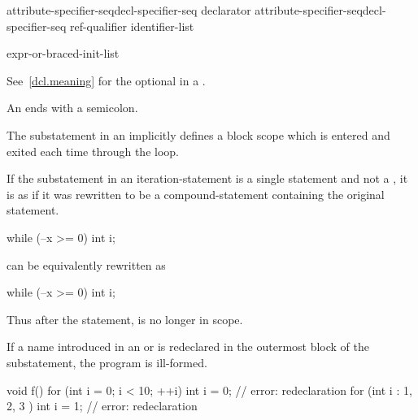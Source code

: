 \begin{bnf}
\br
    attribute-specifier-seq\opt decl-specifier-seq declarator\br
    attribute-specifier-seq\opt decl-specifier-seq ref-qualifier\opt{} \terminal{[} identifier-list \terminal{]}
\end{bnf}

\begin{bnf}
\br
    expr-or-braced-init-list
\end{bnf}

See~\ref{dcl.meaning} for the optional  in a
.
\begin{note}
An  ends with a semicolon.
\end{note}

\pnum
The substatement in an  implicitly defines
a block scope which is entered and exited each time
through the loop.

%
If the substatement in an iteration-statement is a single statement and
not a , it is as if it was rewritten to be
a compound-statement containing the original statement.
\begin{example}

\begin{codeblock}
while (--x >= 0)
  int i;
\end{codeblock}

can be equivalently rewritten as

\begin{codeblock}
while (--x >= 0) {
  int i;
}
\end{codeblock}

Thus after the  statement,  is no longer in scope.
\end{example}

\pnum
If a name introduced in an
 or 
is redeclared in the outermost block of the substatement, the program is ill-formed.
\begin{example}
\begin{codeblock}
void f() {
  for (int i = 0; i < 10; ++i)
    int i = 0;          // error: redeclaration
  for (int i : { 1, 2, 3 })
    int i = 1;          // error: redeclaration
}
\end{codeblock}
\end{example}

